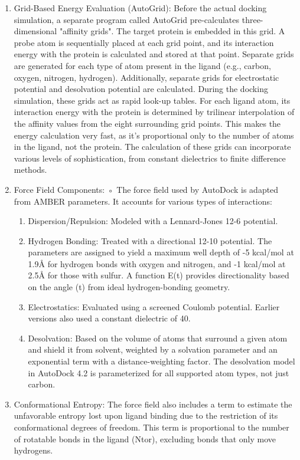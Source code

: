 \documentclass[11pt]{article}
\begin{document}
\begin{enumerate}
\item Grid-Based Energy Evaluation (AutoGrid): Before the actual docking simulation, a separate program called AutoGrid pre-calculates three-dimensional "affinity grids". The target protein is embedded in this grid. A probe atom is sequentially placed at each grid point, and its interaction energy with the protein is calculated and stored at that point. Separate grids are generated for each type of atom present in the ligand (e.g., carbon, oxygen, nitrogen, hydrogen). Additionally, separate grids for electrostatic potential and desolvation potential are calculated. During the docking simulation, these grids act as rapid look-up tables. For each ligand atom, its interaction energy with the protein is determined by trilinear interpolation of the affinity values from the eight surrounding grid points. This makes the energy calculation very fast, as it's proportional only to the number of atoms in the ligand, not the protein. The calculation of these grids can incorporate various levels of sophistication, from constant dielectrics to finite difference methods.
\item Force Field Components:
    ◦ The force field used by AutoDock is adapted from AMBER parameters. It accounts for various types of interactions:
    \begin{enumerate}
        \item Dispersion/Repulsion: Modeled with a Lennard-Jones 12-6 potential.
        \item Hydrogen Bonding: Treated with a directional 12-10 potential. The parameters are assigned to yield a maximum well depth of -5 kcal/mol at 1.9{\AA} for hydrogen bonds with oxygen and nitrogen, and -1 kcal/mol at 2.5{\AA} for those with sulfur. A function E(t) provides directionality based on the angle (t) from ideal hydrogen-bonding geometry.
        \item Electrostatics: Evaluated using a screened Coulomb potential. Earlier versions also used a constant dielectric of 40.
        \item Desolvation: Based on the volume of atoms that surround a given atom and shield it from solvent, weighted by a solvation parameter and an exponential term with a distance-weighting factor. The desolvation model in AutoDock 4.2 is parameterized for all supported atom types, not just carbon.
    \end{enumerate}
\item Conformational Entropy: The force field also includes a term to estimate the unfavorable entropy lost upon ligand binding due to the restriction of its conformational degrees of freedom. This term is proportional to the number of rotatable bonds in the ligand (Ntor), excluding bonds that only move hydrogens.

\end{enumerate}
\end{document}
